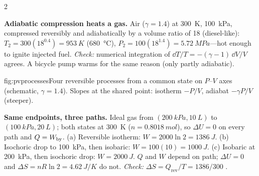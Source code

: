 \begin{multicols}{2}
\begin{demobox}\textbf{Adiabatic compression heats a gas.} Air ($\gamma=1.4$) at \SI{300}{K}, \SI{100}{kPa}, compressed reversibly and adiabatically by a volume ratio of 18 (diesel-like): $T_2=300(18^{0.4})=\SI{953}{K}$ (\SI{680}{\celsius}), $P_2=100(18^{1.4})=\SI{5.72}{MPa}$---hot enough to ignite injected fuel. \emph{Check:} numerical integration of $\dd T/T=-(\gamma-1)\,\dd V/V$ agrees. A bicycle pump warms for the same reason (only partly adiabatic).\end{demobox}

\begin{reffig}{fig:pvprocesses}{Four reversible processes from a common state on $P$--$V$ axes (schematic, $\gamma=1.4$). Slopes at the shared point: isotherm $-P/V$, adiabat $-\gamma P/V$ (steeper).}
\end{reffig}

\begin{demobox}\textbf{Same endpoints, three paths.} Ideal gas from $(\SI{200}{kPa},\SI{10}{L})$ to $(\SI{100}{kPa},\SI{20}{L})$; both states at \SI{300}{K} ($n=\SI{0.8018}{mol}$), so $\Delta U=0$ on every path and $Q=W_{\mathrm{by}}$.
(a) Reversible isotherm: $W=2000\ln2=\SI{1386}{J}$.
(b) Isochoric drop to \SI{100}{kPa}, then isobaric: $W=100(10)=\SI{1000}{J}$.
(c) Isobaric at \SI{200}{kPa}, then isochoric drop: $W=\SI{2000}{J}$.
$Q$ and $W$ depend on path; $\Delta U=0$ and $\Delta S=nR\ln2=\SI{4.62}{J/K}$ do not. \emph{Check:} $\Delta S=Q_{\text{rev}}/T=1386/300$ \checkmark.\end{demobox}


\end{multicols}
